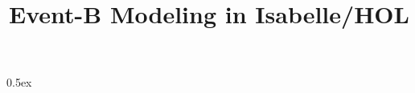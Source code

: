 \documentclass[11pt,a4paper]{article}
\begin{document}
\title{\vspace{-2cm}Event-B Modeling in Isabelle/HOL}
\date{\vspace{-5ex}}
\maketitle


\parindent 0pt\parskip 0.5ex





\end{document}
